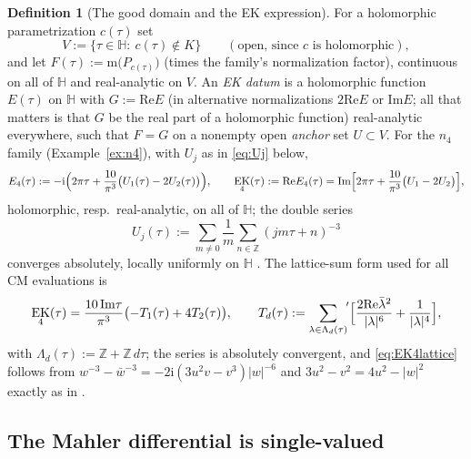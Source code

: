 \documentclass[11pt]{article}
\newcommand{\m}{\mathrm{m}}                 %
\newcommand{\Zz}{\mathbb{Z}}
\newcommand{\Hh}{\mathbb{H}}
\newcommand{\ii}{\mathrm{i}}
\newcommand{\ReT}{\mathrm{Re}}
\newcommand{\ImT}{\mathrm{Im}}
\DeclareMathOperator{\EK}{EK}
\theoremstyle{definition}
\newtheorem{definition}[theorem]{Definition}
\theoremstyle{remark}
\begin{document}
\begin{definition}[The good domain and the EK expression]
For a holomorphic parametrization $c(\tau)$ set
\[
  V:=\bigl\{\tau\in\Hh:\ c(\tau)\notin K\bigr\}\qquad
  (\text{open, since }c\text{ is holomorphic}),
\]
and let $F(\tau):=\m\bigl(P_{c(\tau)}\bigr)$ (times the family's
normalization factor), continuous on all of $\Hh$ and real-analytic
on $V$. An \emph{EK datum} is a holomorphic function $E(\tau)$ on
$\Hh$ with $G:=\ReT E$ (in alternative normalizations $2\ReT E$ or
$\ImT E$; all that matters is that $G$ be the real part of a
holomorphic function) real-analytic everywhere, such that $F=G$ on a
nonempty open \emph{anchor} set $U\subset V$. For the $n_4$ family
(Example~\ref{ex:n4}), with $U_j$ as in \eqref{eq:Uj} below,
\begin{equation}\label{eq:E4}
  E_4(\tau):=-\ii\Bigl(2\pi\tau+\frac{10}{\pi^3}
   \bigl(U_1(\tau)-2U_2(\tau)\bigr)\Bigr),\qquad
  \EK_4(\tau):=\ReT E_4(\tau)
   =\ImT\Bigl[2\pi\tau+\frac{10}{\pi^3}\bigl(U_1-2U_2\bigr)\Bigr],
\end{equation}
holomorphic, resp.\ real-analytic, on all of $\Hh$; the double series
\begin{equation}\label{eq:Uj}
  U_j(\tau):=\sum_{m\neq0}\frac1m\sum_{n\in\Zz}(jm\tau+n)^{-3}
\end{equation}
converges absolutely, locally uniformly on $\Hh$
\cite[\S2.4]{Zf}. The lattice-sum form used for all CM evaluations is
\begin{equation}\label{eq:EK4lattice}
  \EK_4(\tau)=\frac{10\,\ImT\tau}{\pi^3}
   \bigl(-T_1(\tau)+4T_2(\tau)\bigr),\qquad
  T_d(\tau):={\sum_{\lambda\in\Lambda_d(\tau)}}^{\!\prime}
   \Bigl[\frac{2\ReT\bar\lambda^2}{|\lambda|^6}
        +\frac{1}{|\lambda|^4}\Bigr],
\end{equation}
with $\Lambda_d(\tau):=\Zz+\Zz\,d\tau$; the series is absolutely
convergent, and \eqref{eq:EK4lattice} follows from
$w^{-3}-\bar w^{-3}=-2\ii(3u^2v-v^3)|w|^{-6}$ and
$3u^2-v^2=4u^2-|w|^2$ exactly as in \cite[Lemma~2.6]{Zf}.
\end{definition}

\subsection{The Mahler differential is single-valued}\label{subsec:diff}
\end{document}
